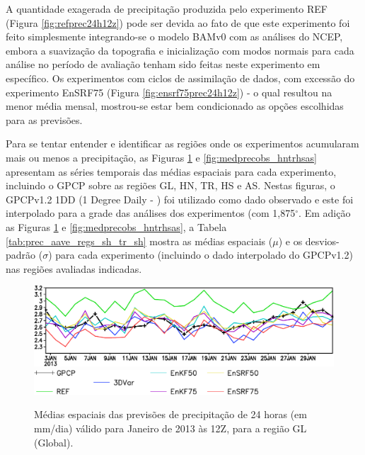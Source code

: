 A quantidade exagerada de precipitação produzida pelo experimento REF (Figura \ref{fig:refprec24h12z}) pode ser devida ao fato de que este experimento foi feito simplesmente integrando-se o modelo BAMv0 com as análises do NCEP, embora a suavização da topografia e inicialização com modos normais para cada análise no período de avaliação tenham sido feitas neste experimento em específico. Os experimentos com ciclos de assimilação de dados, com excessão do experimento EnSRF75 (Figura \ref{fig:ensrf75prec24h12z}) - o qual resultou na menor média mensal, mostrou-se estar bem condicionado as opções escolhidas para as previsões.

Para se tentar entender e identificar as regiões onde os experimentos acumularam mais ou menos a precipitação, as Figuras \ref{fig:medprecobs_gl} e \ref{fig:medprecobs_hntrhsas} apresentam as séries temporais das médias espaciais para cada experimento, incluindo o GPCP sobre as regiões GL, HN, TR, HS e AS. Nestas figuras, o GPCPv1.2 1DD (1 Degree Daily - ) foi utilizado como dado observado e este foi interpolado para a grade das análises dos experimentos (com 1,875$^{\circ}$. Em adição as Figuras \ref{fig:medprecobs_gl} e \ref{fig:medprecobs_hntrhsas}, a Tabela \ref{tab:prec_aave_regs_sh_tr_sh} mostra as médias espaciais ($\mu$) e os desvios-padrão ($\sigma$) para cada experimento (incluindo o dado interpolado do GPCPv1.2) nas regiões avaliadas indicadas.

\begin{figure}[H]
    \vspace{2mm}
    \caption{Médias espaciais das previsões de precipitação de 24 horas (em mm/dia) válido para Janeiro de 2013 às 12Z, para a região GL (Global).}
    \begin{center}
      \includegraphics[width=1\textwidth]{./figs/cap5/aval_prec24h/series_temporais/precip_gpcp_3dvar_3densvar-new_prec_media-artigo-gl-crop.pdf}
      \includegraphics[width=0.75\textwidth]{./figs/cap5/aval_prec24h/series_temporais/precip_gpcp_3dvar_3densvar-new_prec_media-artigo-cbar-crop.pdf}
    \end{center}
    \vspace{2mm}
    \label{fig:medprecobs_gl}
\end{figure}

